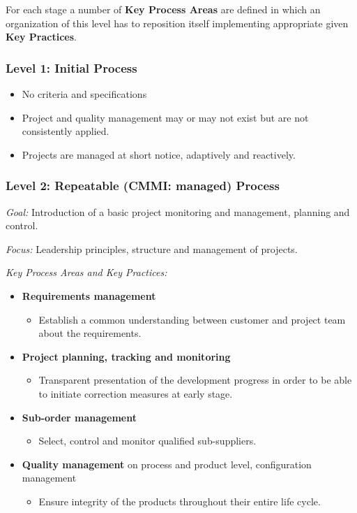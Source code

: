 \documentclass[11pt,a4paper]{article}
\begin{document}
For each stage a number of \textbf {Key Process Areas} are defined in which an
organization of this level has to reposition itself implementing appropriate
given \textbf {Key Practices}.

\subsubsection*{Level 1: Initial Process}
\begin {itemize} [noitemsep]
\item No criteria and specifications
\item Project and quality management may or may not exist but are not 
  consistently applied.
\item Projects are managed at short notice, adaptively and reactively.
\end {itemize}

\subsubsection*{Level 2: Repeatable (CMMI: managed) Process}

\emph {Goal:} Introduction of a basic project monitoring and management,
planning and control.
  
\emph {Focus:} Leadership principles, structure and management of projects.

\emph {Key Process Areas and Key Practices:}
\begin {itemize} [noitemsep]
\item \textbf {Requirements management}
  \begin {itemize} [noitemsep]
  \item Establish a common understanding between customer and project team
    about the requirements.
  \end {itemize}
\item \textbf {Project planning, tracking and monitoring}
  \begin {itemize} [noitemsep]
  \item Transparent presentation of the development progress in order to be
    able to initiate correction measures at early stage.
  \end {itemize}
\item \textbf {Sub-order management}
  \begin {itemize} [noitemsep]
  \item Select, control and monitor qualified sub-suppliers.
  \end {itemize}
\item \textbf {Quality management} on process and product level, configuration
  management
  \begin {itemize} [noitemsep]
  \item Ensure integrity of the products throughout their entire life cycle.
  \end {itemize}
\end {itemize}
\end{document}
